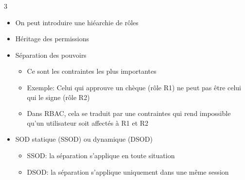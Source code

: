 \documentclass[9pt, a4paper, twoside]{article}
\begin{document}
\begin{multicols}{3}
\begin{itemize}[label=$\bullet$]
    \item \scriptsize On peut introduire une hiéarchie de rôles
    \item \scriptsize Héritage des permissions
\end{itemize}

\begin{itemize}[label=$\bullet$]
    \item \scriptsize  Séparation des pouvoirs
    \begin{itemize}[label=$\circ$]
        \item \scriptsize Ce sont les contraintes les plus importantes
        \item \scriptsize Exemple: Celui qui approuve un chèque (rôle R1) ne peut pas être celui qui le signe (rôle R2)
        \item \scriptsize Dans RBAC, cela se traduit par une contraintes qui rend impossible qu'un utilisateur soit affectés à R1 et R2
    \end{itemize}
    \item \scriptsize SOD statique (SSOD) ou dynamique (DSOD)
    \begin{itemize}[label=$\circ$]
        \item \scriptsize SSOD: la séparation s'applique en toute situation
        \item \scriptsize DSOD: la séparation s'applique uniquement dans une même session
    \end{itemize}
\end{itemize}


\end{multicols}
\end{document}
